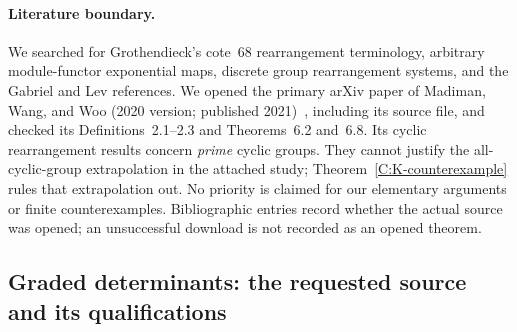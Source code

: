 

\paragraph{Literature boundary.}
We searched for Grothendieck's cote~68 rearrangement terminology, arbitrary module-functor exponential maps, discrete group rearrangement systems, and the Gabriel and Lev references. We opened the primary arXiv paper of Madiman, Wang, and Woo (2020 version; published 2021)~\cite{C_MWW2021}, including its source file, and checked its Definitions~2.1--2.3 and Theorems~6.2 and~6.8. Its cyclic rearrangement results concern \emph{prime} cyclic groups. They cannot justify the all-cyclic-group extrapolation in the attached study; Theorem~\ref{C:K-counterexample} rules that extrapolation out. No priority is claimed for our elementary arguments or finite counterexamples. Bibliographic entries record whether the actual source was opened; an unsuccessful download is not recorded as an opened theorem.

\subsection{Graded determinants: the requested source and its qualifications}

